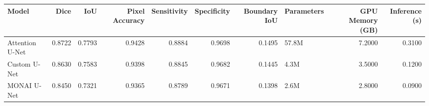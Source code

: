 \begin{tabular}{lrrrrrrlrr}
\toprule
Model & Dice & IoU & Pixel Accuracy & Sensitivity & Specificity & Boundary IoU & Parameters & GPU Memory (GB) & Inference (s) \\
\midrule
Attention U-Net & 0.8722 & 0.7793 & 0.9428 & 0.8884 & 0.9698 & 0.1495 & 57.8M & 7.2000 & 0.3100 \\
Custom U-Net & 0.8630 & 0.7583 & 0.9398 & 0.8845 & 0.9682 & 0.1445 & 4.3M & 3.5000 & 0.1200 \\
MONAI U-Net & 0.8450 & 0.7321 & 0.9365 & 0.8789 & 0.9671 & 0.1398 & 2.6M & 2.8000 & 0.0900 \\
\bottomrule
\end{tabular}
